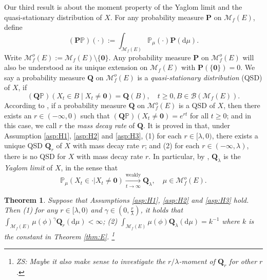\documentclass[12pt,a4paper]{amsart}
\numberwithin{equation}{section}
\theoremstyle{plain}
\newtheorem{thm}{Theorem}[section]
\theoremstyle{definition}
\theoremstyle{remark}
\begin{document}
	Our third result is about the moment property of the Yaglom limit and the quasi-stationary distribution of $X$.
	For any probability measure $\mathbf P$ on $\mathcal M_f(E)$, define 
\[
	(\mathbf P\mathbb P)(\cdot) 
	:= \int_{\mathcal M_f(E)} \mathbb P_\mu(\cdot)\mathbf P({\mathrm d}\mu).
\] 
	Write $\mathcal M_f^o(E) := \mathcal M_f(E)\setminus \{ \mathbf 0\}$. 
	Any probability measure $\mathbf P$ on $\mathcal M_f^o(E)$ will also be understood as its unique extension on $\mathcal M_f(E)$ with  $\mathbf P(\{\mathbf 0\}) = 0$. 
	We say a probability measure $\mathbf Q$ on $\mathcal M^o_f(E)$ is a \emph{quasi-stationary distribution} (QSD) of $X$, if%
\[
	(\mathbf Q \mathbb P) \left( X_t \in B \middle | X_t \neq \mathbf 0 \right) 
	= \mathbf Q(B), 
	\quad t\geq 0, B \in \mathcal B(\mathcal M_f(E)).
\]
	According to \cite[(1.5)]{LiuRenSongSun2020}, if a probability measure $\mathbf Q$ on $\mathcal M_f^o(E)$ is a QSD of $X$, then there exists an $r\in (-\infty, 0)$ such that $(\mathbf Q\mathbb P)(X_t \neq \mathbf 0) = e^{rt}$ for all $t\geq 0$; and in this case, we call $r$ the \emph{mass decay rate} of $\mathbf Q$.
	It is proved in \cite[Theorem 1.2]{LiuRenSongSun2020} that, under Assumption \eqref{asp:H1}, \eqref{asp:H2} and \eqref{asp:H3}, 
	(1) for each $r\in [\lambda, 0)$, there exists a unique QSD $\mathbf Q_r$ of $X$ with mass decay rate $r$; 
	and (2) for each $r\in (-\infty, \lambda)$, there is no QSD for $X$ with mass decay rate $r$.
	In particular, by \cite[Theorem 1.1, Proposition 1.7]{LiuRenSongSun2020}, $\mathbf Q_\lambda$ is the \emph{Yaglom limit} of $X$, in the sense that
\begin{equation} 
	\mathbb P_\mu(X_t \in \cdot | X_t \neq \mathbf 0) 
	\xrightarrow[t\to \infty]{\text{weakly}} \mathbf Q_\lambda,%
	\quad \mu \in \mathcal M_f^o(E).   
\end{equation}

\begin{thm}\label{thm:L}
	Suppose that Assumptions \eqref{asp:H1}, \eqref{asp:H2} and \eqref{asp:H3} hold.
	Then (1) 
	for any $r\in [\lambda, 0)$ and $\gamma \in (0, \frac{r}{\lambda})$, it holds that $\int_{{\mathcal M}_f(E)}\mu(\phi)^\gamma\mathbf Q_r({\mathrm d}\mu)<\infty$; 
	(2) $\int_{{\mathcal M}_f(E)}\mu(\phi)\mathbf Q_\lambda({\mathrm d}\mu) = k^{-1}$ where 
	$k$ is  the constant in Theorem \ref{thm:E}. 
	\footnote{ZS: Maybe it also make sense to investigate the $r/\lambda$-moment of $\mathbf Q_r$ for other $r$.} 
\end{thm}
\end{document}
